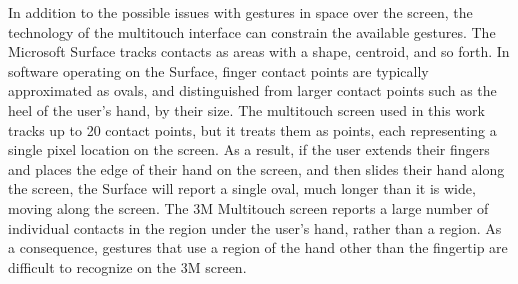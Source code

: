 In addition to the possible issues with gestures in space over the screen, the technology of the multitouch interface can constrain the available gestures. 
The Microsoft Surface tracks contacts as areas with a shape, centroid, and so forth. 
In software operating on the Surface, finger contact points are typically approximated as ovals, and distinguished from larger contact points such as the heel of the user's hand, by their size. 
The multitouch screen used in this work tracks up to 20 contact points, but it treats them as points, each representing a single pixel location on the screen. 
As a result, if the user extends their fingers and places the edge of their hand on the screen, and then slides their hand along the screen, the Surface will report a single oval, much longer than it is wide, moving along the screen. 
The 3M Multitouch screen reports a large number of individual contacts in the region under the user's hand, rather than a region.
As a consequence, gestures that use a region of the hand other than the fingertip are difficult to recognize on the 3M screen. 


